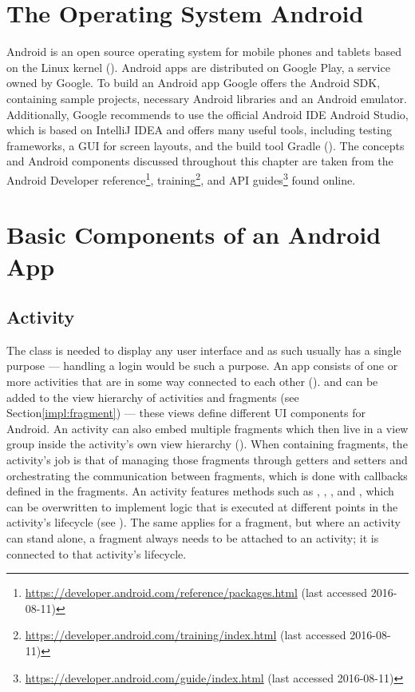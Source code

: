 \section{The Operating System Android}
Android is an open source operating system for mobile phones and tablets based on the Linux kernel (\cite{androiddef}). Android apps are distributed on Google Play, a service owned by Google. To build an Android app Google offers the Android \gls{SDK}, containing sample projects, necessary Android libraries and an Android emulator. Additionally, Google recommends to use the official Android \gls{IDE} Android Studio, which is based on IntelliJ IDEA and offers many useful tools, including testing frameworks, a \gls{GUI} for screen layouts, and the build tool Gradle (\cite{androidstudio}). The concepts and Android components discussed throughout this chapter are taken from the Android Developer reference\footnote{\url{https://developer.android.com/reference/packages.html} (last accessed 2016-08-11)}, training\footnote{\url{https://developer.android.com/training/index.html} (last accessed 2016-08-11)}, and \gls{API} guides\footnote{\url{https://developer.android.com/guide/index.html} (last accessed 2016-08-11)} found online.

\section{Basic Components of an Android App}

\subsection{Activity}
The  class is needed to display any user interface and as such usually has a single purpose --- handling a login would be such a purpose. An app consists of one or more activities that are in some way connected to each other (\cite{activities_in_app}).  and  can be added to the view hierarchy of activities and fragments (see Section\ref{impl:fragment}) --- these views define different UI components for Android. An activity can also embed multiple fragments which then live in a view group inside the activity's own view hierarchy (\cite{androidfragment}). When containing fragments, the activity’s job is that of managing those fragments through getters and setters and orchestrating the communication between fragments, which is done with callbacks defined in the fragments. 
An activity features methods such as , , , and , which can be overwritten to implement logic that is executed at different points in the activity's lifecycle (see ). The same applies for a fragment, but where an activity can stand alone, a fragment always needs to be attached to an activity; it is connected to that activity's lifecycle.


